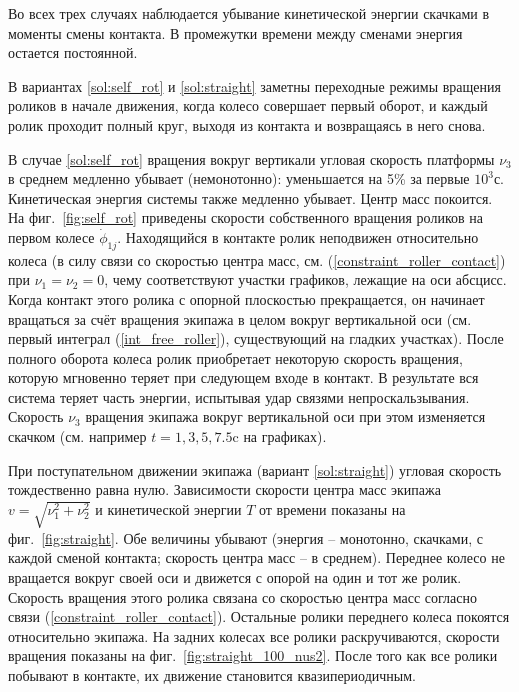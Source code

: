 Во всех трех случаях наблюдается убывание кинетической энергии скачками в моменты смены контакта. В промежутки времени между сменами энергия остается постоянной.

В вариантах \ref{sol:self_rot} и \ref{sol:straight} заметны переходные режимы вращения роликов в начале движения, когда колесо совершает первый оборот, и каждый ролик проходит полный круг, выходя из контакта и возвращаясь в него снова.

В случае \ref{sol:self_rot} вращения вокруг вертикали угловая скорость платформы $\nu_3$ в среднем медленно убывает (немонотонно): уменьшается на 5\%  за первые $10^3$с. Кинетическая энергия системы также медленно убывает. Центр масс покоится. На фиг.~\ref{fig:self_rot} приведены скорости собственного вращения роликов на первом колесе $\dot{\phi}_{1j}$. Находящийся в контакте ролик неподвижен относительно колеса (в силу связи со скоростью центра масс, см. (\ref{constraint_roller_contact}) при $\nu_1 = \nu_2 = 0$, чему соответствуют участки графиков, лежащие на оси абсцисс. Когда контакт этого ролика с опорной плоскостью прекращается, он начинает вращаться за счёт вращения экипажа в целом вокруг вертикальной оси (см. первый интеграл (\ref{int_free_roller}), существующий на гладких участках). После полного оборота колеса ролик приобретает некоторую скорость вращения, которую мгновенно теряет при следующем входе в контакт. В результате вся система теряет часть энергии, испытывая удар связями непроскальзывания. Скорость $\nu_3$ вращения экипажа вокруг вертикальной оси при этом изменяется скачком (см. например $t=1, 3, 5, 7.5$c на графиках).

При поступательном движении экипажа (вариант \ref{sol:straight}) угловая скорость тождественно равна нулю. Зависимости скорости центра масс экипажа $v = \sqrt{\nu_1^2+\nu_2^2}$ и кинетической энергии $T$ от времени показаны на фиг.~\ref{fig:straight}. Обе величины убывают (энергия -- монотонно, скачками, с каждой сменой контакта; скорость центра масс -- в среднем). Переднее колесо не вращается вокруг своей оси и движется с опорой на один и тот же ролик. Скорость вращения этого ролика связана со скоростью центра масс согласно связи (\ref{constraint_roller_contact}). Остальные ролики переднего колеса покоятся относительно экипажа. На задних колесах все ролики раскручиваются, скорости вращения показаны на фиг.~\ref{fig:straight_100_nus2}. После того как все ролики побывают в контакте, их движение становится квазипериодичным.

